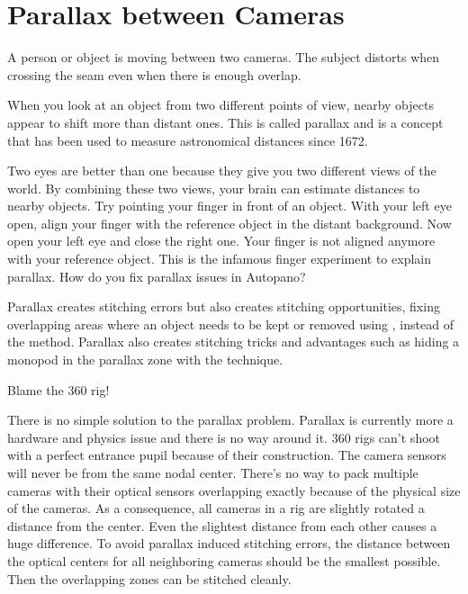 \section{Parallax between Cameras}
\pagecolor{white}
\label{chap:37}
\begin{fullwidth}

\problem

{\large A person or object is moving between two cameras. The subject distorts when crossing the seam even when there is enough overlap. \par}

When you look at an object from two different points of view, nearby objects appear to shift more than distant ones. This is called parallax and is a concept that has been used to measure astronomical distances since 1672.


Two eyes are better than one because they give you two different views of the world. By combining these two views, your brain can estimate distances to nearby objects. Try pointing your finger in front of an object. With your left eye open, align your finger with the reference object in the distant background. Now open your left eye and close the right one. Your finger is not aligned anymore with your reference object. This is the infamous finger experiment to explain parallax. How do you fix parallax issues in Autopano?

\solutions

Parallax creates stitching errors but also creates stitching opportunities, fixing overlapping areas where an object needs to be kept or removed using \textbf{}, instead of the \textbf{} method. Parallax also creates stitching tricks and advantages such as hiding a monopod in the parallax zone with the \textbf{} technique.

{\large Blame the 360 rig! \par}

There is no simple solution to the parallax problem. Parallax is currently more a hardware and physics issue and there is no way around it. 360 rigs can't shoot with a perfect entrance pupil because of their construction. The camera sensors will never be from the same nodal center. There’s no way to pack multiple cameras with their optical sensors overlapping exactly because of the physical size of the cameras. As a consequence, all cameras in a rig are slightly rotated a distance from the center. Even the slightest distance from each other causes a huge difference. To avoid parallax induced stitching errors, the distance between the optical centers for all neighboring cameras should be the smallest possible. Then the overlapping zones can be stitched cleanly. 


\end{fullwidth}
